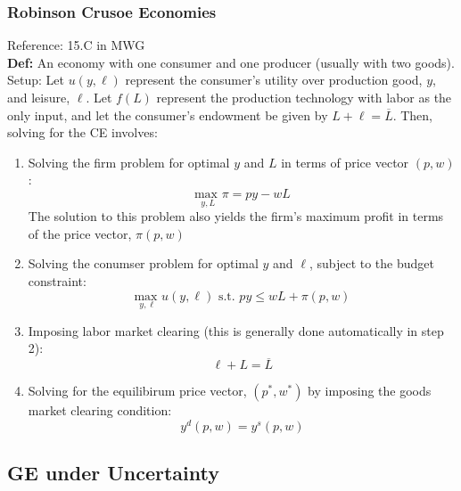 \documentclass{article}
\newcommand{\usmax}[1]{\underset{#1}{\text{max }}}
\newcommand{\red}[1]{{\color{red}#1}}
\newcommand{\blue}[1]{{\color{blue}#1}}
\begin{document}
\subsubsection{Robinson Crusoe Economies}
\red{Reference: 15.C in MWG}
\medskip \\
\textbf{Def:} An economy with one consumer and one producer (usually with two goods).
\medskip \\
\blue{Setup:} Let $u(y,\ell)$ represent the consumer's utility over production good, $y$, and leisure, $\ell$. Let $f(L)$ represent the production technology with labor as the only input, and let the consumer's endowment be given by ${L + \ell = \overline{L}}$. Then, solving for the CE involves:
\begin{enumerate}
	\item Solving the firm problem for optimal $y$ and $L$ in terms of price vector $(p,w)$:
		\[
			\usmax{y,L}\pi = py-wL
		\]
		The solution to this problem also yields the firm's maximum profit in terms of the price vector, $\pi(p,w)$
	\item Solving the conumser problem for optimal $y$ and $\ell$, subject to the budget constraint:
		\[
			\usmax{y,\ell} u(y,\ell)\text{ s.t. } py \leq wL + \pi(p,w)
		\]
	\item Imposing labor market clearing (this is generally done automatically in step 2):
		\[
			\ell + L=\overline{L}
		\]
	\item Solving for the equilibirum price vector, $(p^*,w^*)$ by imposing the goods market clearing condition:
		\[
			y^d(p,w) = y^s(p,w)
		\]
\end{enumerate}


\subsection{GE under Uncertainty}
\end{document}
